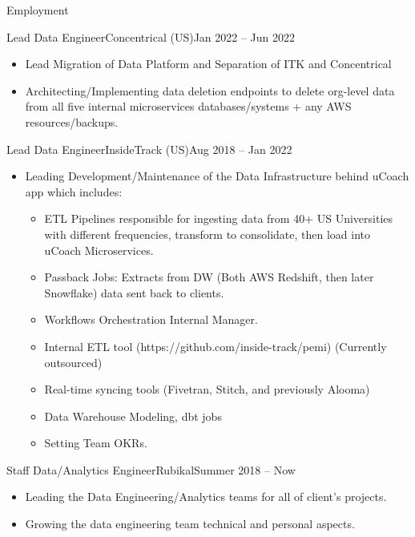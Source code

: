 \documentclass[]{ahmedamrcv_saudi}
\begin{document}
\begin{cvsection}{Employment}
		\begin{cvsubsection}{Lead Data Engineer}{Concentrical (US)}{Jan 2022 -- Jun 2022}
			\begin{itemize}
				\item Lead Migration of Data Platform and Separation of ITK and Concentrical
				\item Architecting/Implementing data deletion endpoints to delete org-level data from all five internal microservices databases/systems + any AWS resources/backups.
			\end{itemize}
		\end{cvsubsection}

		\begin{cvsubsection}{Lead Data Engineer}{InsideTrack (US)}{Aug 2018 -- Jan 2022}
			\begin{itemize}
				\item Leading Development/Maintenance of the Data Infrastructure behind uCoach app which includes:
				\begin{itemize}
					\item ETL Pipelines responsible for ingesting data from 40+ US Universities with different frequencies, transform to consolidate, then load into uCoach Microservices.
					\item Passback Jobs: Extracts from DW (Both AWS Redshift, then later Snowflake) data sent back to clients.
					\item Workflows Orchestration Internal Manager.
					\item Internal ETL tool (https://github.com/inside-track/pemi) (Currently outsourced)
					\item Real-time syncing tools (Fivetran, Stitch, and previously Alooma)
					\item Data Warehouse Modeling, dbt jobs
					\item Setting Team OKRs.
				\end{itemize}
			\end{itemize}
		\end{cvsubsection}

		\begin{cvsubsection}{Staff Data/Analytics Engineer}{Rubikal}{Summer 2018 -- Now}
			\begin{itemize}
				\item Leading the Data Engineering/Analytics teams for all of client's projects.
				\item Growing the data engineering team technical and personal aspects.
			\end{itemize}
		\end{cvsubsection}
		

\end{cvsection}
\end{document}
